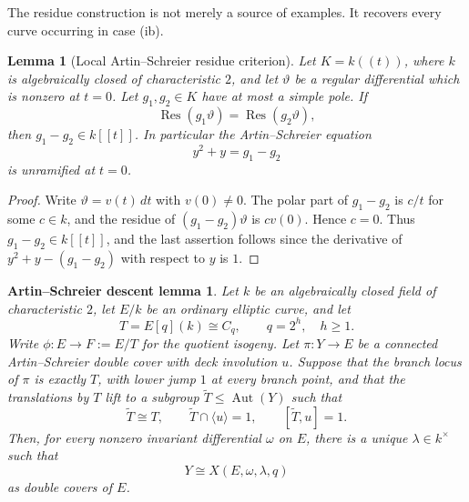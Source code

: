 \documentclass[11pt]{article}
\newtheorem{lemma}[theorem]{Lemma}
\newtheorem{ASdescent}[theorem]{Artin--Schreier descent lemma}
\theoremstyle{remark}
\newcommand{\Aut}{\operatorname{Aut}}
\newcommand{\Res}{\operatorname{Res}}
\begin{document}
The residue construction is not merely a source of examples.  It
recovers every curve occurring in case \textup{(ib)}.

\begin{lemma}[Local Artin--Schreier residue criterion]\label{lem:localASresidue}
Let $K=k((t))$, where $k$ is algebraically closed of characteristic $2$,
and let $\vartheta$ be a regular differential which is nonzero at
$t=0$.  Let $g_1,g_2\in K$ have at most a simple pole.  If
\[
        \Res(g_1\vartheta)=\Res(g_2\vartheta),
\]
then $g_1-g_2\in k[[t]]$.  In particular the Artin--Schreier equation
\[
        y^2+y=g_1-g_2
\]
is unramified at $t=0$.
\end{lemma}

\begin{proof}
Write $\vartheta=v(t)\,dt$ with $v(0)\ne0$.  The polar part of
$g_1-g_2$ is $c/t$ for some $c\in k$, and the residue of
$(g_1-g_2)\vartheta$ is $cv(0)$.  Hence $c=0$.  Thus
$g_1-g_2\in k[[t]]$, and the last assertion follows since the derivative
of $y^2+y-(g_1-g_2)$ with respect to $y$ is $1$.
\end{proof}

\begin{ASdescent}\label{lem:ASdescent}
Let $k$ be an algebraically closed field of characteristic $2$, let $E/k$
be an ordinary elliptic curve, and let
\[
        T=E[q](k)\cong C_q,\qquad q=2^h,\quad h\ge1.
\]
Write $\phi:E\to F:=E/T$ for the quotient isogeny.  Let
$\pi:Y\to E$ be a connected Artin--Schreier double cover with deck
involution $u$.  Suppose that the branch locus of $\pi$ is exactly $T$,
with lower jump $1$ at every branch point, and that the translations by
$T$ lift to a subgroup $\widetilde T\leq\Aut(Y)$ such that
\[
        \widetilde T\cong T,\qquad
        \widetilde T\cap\langle u\rangle=1,
        \qquad [\widetilde T,u]=1.
\]
Then, for every nonzero invariant differential $\omega$ on $E$, there is
a unique $\lambda\in k^\times$ such that
\[
        Y\cong X(E,\omega,\lambda,q)
\]
as double covers of $E$.
\end{ASdescent}
\end{document}
